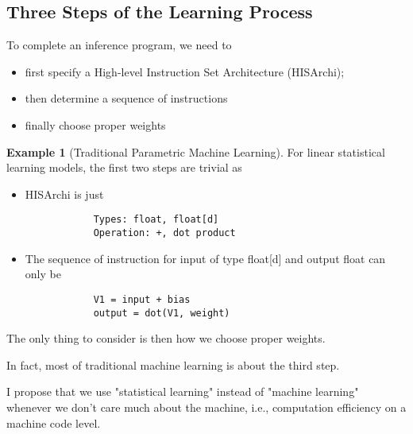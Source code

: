 \documentclass[10pt, oneside]{article}   	%
\theoremstyle{definition}
\newtheorem*{eg}{Example}
\begin{document}
\subsection{Three Steps of the Learning Process}
To complete an inference program, we need to
\begin{itemize}
	\item first specify a High-level Instruction Set Architecture (HISArchi);
	\item then determine a sequence of instructions
	\item finally choose proper weights
\end{itemize}
\begin{eg}[Traditional Parametric Machine Learning]
	For linear statistical learning models, the first two steps are trivial as
	\begin{itemize}
		\item HISArchi is just
		\begin{verbatim}
			Types: float, float[d]
			Operation: +, dot product
		\end{verbatim}
		\item The sequence of instruction for input of type float[d] and output float can only be
		\begin{verbatim}
			V1 = input + bias
			output = dot(V1, weight)
		\end{verbatim}
	\end{itemize}

	The only thing to consider is then how we choose proper weights.

	In fact, most of traditional machine learning is about the third step.
\end{eg}
\begin{rmk}
	I propose that we use "statistical learning" instead of "machine learning" whenever we don't care much about the machine, i.e., computation efficiency on a machine code level.
\end{rmk}
\end{document}
